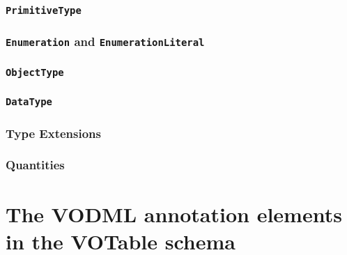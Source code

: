\documentclass[11pt,a4paper]{ivoa}
\begin{document}
\subsubsection{\textbf{\texttt{PrimitiveType}}}\label{primitivetype}

\subsubsection{\textbf{\texttt{Enumeration}} and
\textbf{\texttt{EnumerationLiteral}}}\label{enumeration-and-enumerationliteral}

\subsubsection{\textbf{\texttt{ObjectType}}}\label{objecttype}

\subsubsection{\textbf{\texttt{DataType}}}\label{datatype}

\subsubsection{Type Extensions}\label{type-extensions}

\subsubsection{Quantities}\label{quantities}

\section{The VODML annotation elements in the VOTable schema}\label{sec:schema}

\pagebreak

\end{document}

